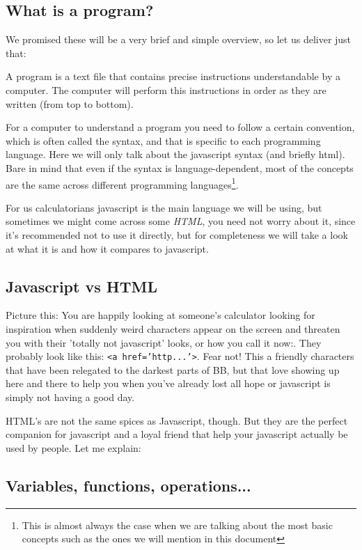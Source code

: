 \subsection{What is a program?} 
\label{sub:program}
We promised these will be a very brief and simple overview, so let us deliver just that:

A program is a text file that contains precise instructions understandable by a computer. The computer will perform this instructions in order as they are written (from top to bottom). 

For a computer to understand a program you need to follow a certain convention, which is often called the syntax, and that is specific to each programming language. Here we will only talk about the javascript syntax (and briefly html). Bare in mind that even if the syntax is language-dependent, most of the concepts are the same across different programming languages\footnote{This is almost always the case when we are talking about the most basic concepts such as the ones we will mention in this document}.

For us calculatorians javascript is the main language we will be using, but sometimes we might come across some \textit{HTML}, you need not worry about it, since it's recommended not to use it directly, but for completeness we will take a look at what it is and how it compares to javascript.
\subsection{Javascript vs HTML}
\label{sub:jsHtml}
Picture this: You are happily looking at someone's calculator looking for inspiration when suddenly weird characters appear on the screen and threaten you with their 'totally not javascript' looks, or how you call it now:. They probably look like this: \texttt{<a href='http...'>}. Fear not! This a friendly characters that have been relegated to the darkest parts of BB, but that love showing up here and there to help you when you've already lost all hope or javascript is simply not having a good day. 

HTML's are not the same spices as Javascript, though. But they are the perfect companion for javascript and a loyal friend that help your javascript actually be used by people. Let me explain:



\subsection{Variables, functions, operations...}
\label{sub:types}
